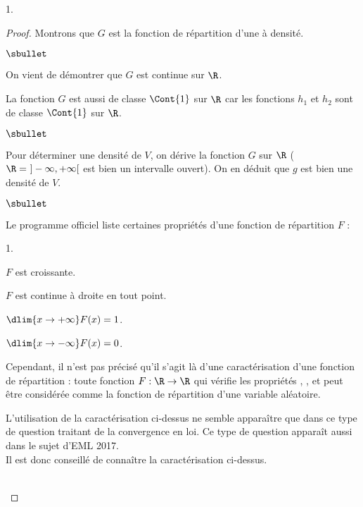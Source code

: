 \documentclass[11pt]{article}%
\begin{document}
\begin{noliste}{1.}
\begin{proof}
  
  \newpage


  \noindent
  Montrons que $G$ est la fonction de répartition d'une \var à
  densité.
  \begin{noliste}{$\sbullet$}
  \item On vient de démontrer que $G$ est continue sur $\R$.
  \item La fonction $G$ est aussi de classe $\Cont{1}$ sur $\R$ car
    les fonctions $h_1$ et $h_2$ sont de classe $\Cont{1}$ sur $\R$.
  \end{noliste}

\begin{noliste}{$\sbullet$}  
\item Pour déterminer une densité de $V$, on dérive la fonction $G$
  sur $\R$ ($\R = \ ]-\infty,+\infty[$ est bien un intervalle ouvert).
  On en déduit que $g$ est bien une densité de $V$.
 \end{noliste}
\begin{remark}%
  \begin{noliste}{$\sbullet$}
  \item Le programme officiel liste certaines propriétés d'une fonction de
    répartition $F$ :
    \begin{noliste}{\scriptsize 1.}
    \item $F$ est croissante.
    \item $F$ est continue à droite en tout point.
    \item $\dlim{x\to+\infty} F(x)=1$.
    \item $\dlim{x\to-\infty} F(x)=0$.
    \end{noliste}
    Cependant, il n'est pas précisé qu'il s'agit là d'une
    caractérisation d'une fonction de répartition : toute fonction $F
    : \R \to \R$ qui vérifie les propriétés , ,
     et  peut être considérée comme la fonction de
    répartition d'une variable aléatoire.

  \item L'utilisation de la caractérisation ci-dessus ne semble
    apparaître que dans ce type de question traitant de la convergence
    en loi. Ce type de question apparaît aussi dans le sujet d'EML
    2017.\\
    Il est donc conseillé de connaître la caractérisation ci-dessus.
  \end{noliste}
 \end{remark}~\\[-1.3cm]
\end{proof}

\end{noliste} 
\end{document}
